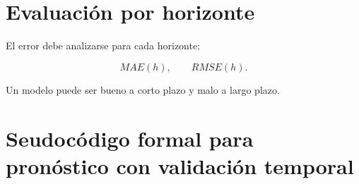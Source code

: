 \documentclass[
  spanish,
  10.5pt,
  letterpaper,
  DIV=11,
  numbers=noendperiod,
  oneside,
  open=any]{scrreprt}
\theoremstyle{definition}
\theoremstyle{definition}
\theoremstyle{plain}
\theoremstyle{remark}
\begin{document}
\section*{Evaluación por horizonte}\label{evaluaciuxf3n-por-horizonte}


El error debe analizarse para cada horizonte:

\[
MAE(h),
\qquad
RMSE(h).
\]

Un modelo puede ser bueno a corto plazo y malo a largo plazo.

\section*{Seudocódigo formal para pronóstico con validación
temporal}\label{seudocuxf3digo-formal-para-pronuxf3stico-con-validaciuxf3n-temporal}

\end{document}

